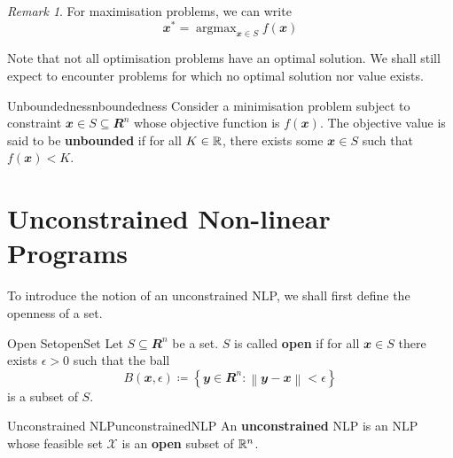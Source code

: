 \documentclass[math, code]{amznotes}
\theoremstyle{remark}
\newtheorem*{remark}{Remark}
\DeclareMathOperator*{\argmax}{argmax}
\begin{document}
\begin{notebox}
    \begin{remark}
        For maximisation problems, we can write
        \begin{equation*}
            \mathbfit{x}^* = \argmax_{\mathbfit{x} \in S} f(\mathbfit{x})
        \end{equation*}
    \end{remark}
\end{notebox}
Note that not all optimisation problems have an optimal solution. We shall still expect to encounter problems for which no optimal solution nor value exists.
\begin{dfnbox}{Unboundedness}{nboundedness}
    Consider a minimisation problem subject to constraint $\mathbfit{x} \in S \subseteq \mathbfit{R}^n$ whose objective function is $f(\mathbfit{x})$. The objective value is said to be {\color{red} \textbf{unbounded}} if for all $K \in \mathbb{R}$, there exists some $\mathbfit{x} \in S$ such that $f(\mathbfit{x}) < K$.
\end{dfnbox}
\section{Unconstrained Non-linear Programs}
To introduce the notion of an unconstrained NLP, we shall first define the openness of a set.
\begin{dfnbox}{Open Set}{openSet}
    Let $S \subseteq \mathbfit{R}^n$ be a set. $S$ is called {\color{red} \textbf{open}} if for all $\mathbfit{x} \in S$ there exists $\epsilon > 0$ such that the ball
    \begin{equation*}
        B(\mathbfit{x}, \epsilon) \coloneqq \left\{\mathbfit{y} \in \mathbfit{R}^n \colon \left\lVert \mathbfit{y - x} \right\rVert < \epsilon\right\}
    \end{equation*}
    is a subset of $S$.
\end{dfnbox}
\begin{dfnbox}{Unconstrained NLP}{unconstrainedNLP}
    An {\color{red} \textbf{unconstrained}} NLP is an NLP whose feasible set $\mathcal{X}$ is an {\color{red} \textbf{open}} subset of $\mathbb{R}^n$.
\end{dfnbox}
\end{document}
